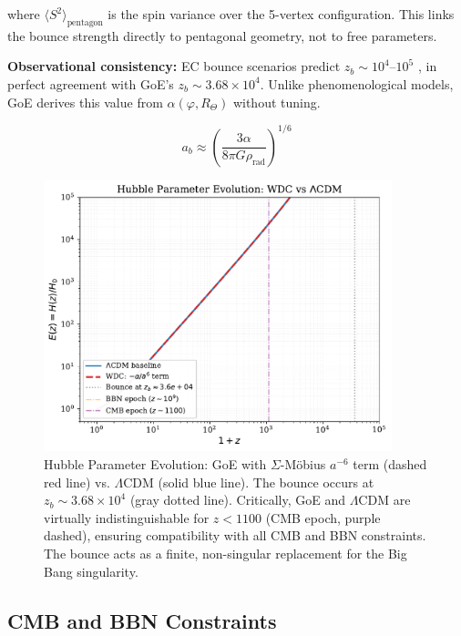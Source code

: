 \documentclass[12pt]{article}
\theoremstyle{definition}
\theoremstyle{plain}
\begin{document}
where $\langle S^2 \rangle_{\text{pentagon}}$ is the spin variance over the 5-vertex configuration. This links the bounce strength directly to pentagonal geometry, not to free parameters.

\textbf{Observational consistency:} EC bounce scenarios predict $z_b \sim 10^4$--$10^5$ \cite{poplawski2010,magueijo2013}, in perfect agreement with GoE's $z_b \sim 3.68 \times 10^4$. Unlike phenomenological models, GoE derives this value from $\alpha(\varphi, R_\Theta)$ without tuning.

\begin{equation}
a_b \approx \left(\frac{3\alpha}{8\pi G \rho_{\text{rad}}}\right)^{1/6}
\end{equation}

\begin{figure}[H]
\centering
\includegraphics[width=0.9\textwidth]{figures/fig_Hz_bounce.pdf}
\caption{Hubble Parameter Evolution: GoE with $\Sigma$-M\"obius $a^{-6}$ term (dashed red line) vs. $\Lambda$CDM (solid blue line). The bounce occurs at $z_b \sim 3.68 \times 10^4$ (gray dotted line). Critically, GoE and $\Lambda$CDM are virtually indistinguishable for $z < 1100$ (CMB epoch, purple dashed), ensuring compatibility with all CMB and BBN constraints. The bounce acts as a finite, non-singular replacement for the Big Bang singularity.}
\label{fig:bounce_comparison}
\end{figure}

\subsection{CMB and BBN Constraints}
\end{document}
